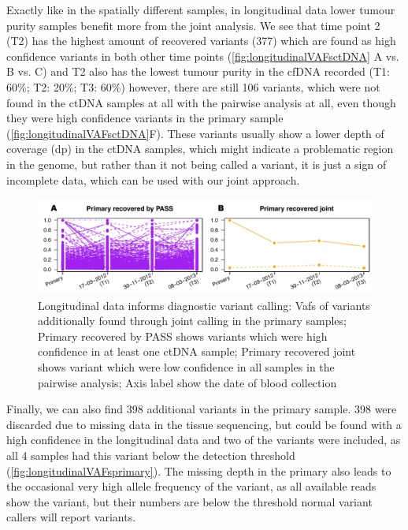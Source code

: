 Exactly like in the spatially different samples, in longitudinal data lower tumour purity samples benefit more from the joint analysis. We see that time point 2 (T2) has the highest amount of recovered variants (377) which are found as high confidence variants in both other time points (\autoref{fig:longitudinalVAFsctDNA} A vs. B vs. C) and T2 also has the lowest tumour purity in the cfDNA recorded (T1: 60\%; T2: 20\%; T3: 60\%) however, there are still 106 variants, which were not found in the ctDNA samples at all with the pairwise analysis at all, even though they were high confidence variants in the primary sample (\autoref{fig:longitudinalVAFsctDNA}F). These variants usually show a lower depth of coverage (dp) in the ctDNA samples, which might indicate a problematic region in the genome, but rather than it not being called a variant, it is just a sign of incomplete data, which can be used with our joint approach. 

\begin{figure}[!ht]
\centering
\includegraphics[width=.99\linewidth]{Figures/longitudinalCA9primaryVafs.pdf}
\caption[Longitudinal data informs diagnostic variant calling]{Longitudinal data informs diagnostic variant calling: Vafs of variants additionally found through joint calling in the primary samples; Primary recovered by PASS shows variants which were high confidence in at least one ctDNA sample; Primary recovered joint shows variant which were low confidence in all samples in the pairwise analysis; Axis label show the date of blood collection}\label{fig:longitudinalVAFsprimary}
\end{figure}


Finally, we can also find 398 additional variants in the   primary sample. 398 were discarded due to missing data in the tissue sequencing, but could be found with a high confidence in the longitudinal data and two of the variants were included, as all 4 samples had this variant below the detection threshold (\autoref{fig:longitudinalVAFsprimary}). The missing depth in the primary also leads to the occasional very high allele frequency of the variant, as all available reads show the variant, but their numbers are below the threshold normal variant callers will report variants.

